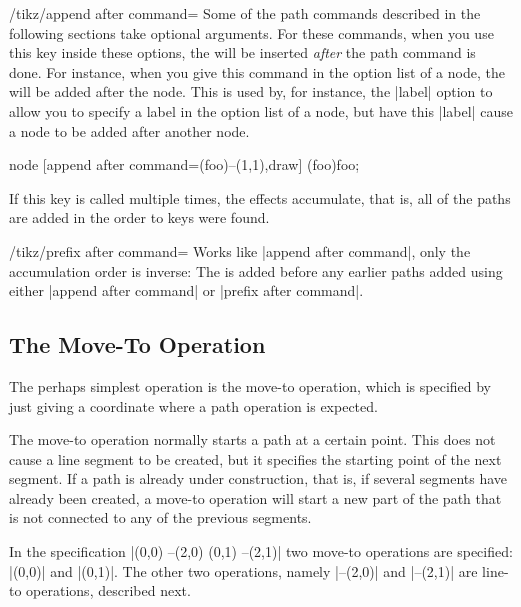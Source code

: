 \begin{key}{/tikz/append after command=}
  Some of the path commands described in the following sections take
  optional arguments. For these commands, when you use this key inside
  these options, the  will be inserted \emph{after} the
  path command is done. For instance, when you give this command in
  the option list of a node, the  will be added after the
  node. This is used by, for instance, the |label| option to allow you
  to specify a label in the option list of a node, but have this
  |label| cause a node to be added after another node.
\begin{codeexample}[]
\tikz \draw node [append after command={(foo)--(1,1)},draw] (foo){foo};
\end{codeexample}
  If this key is called multiple times, the effects accumulate, that
  is, all of the paths are added in the order to keys were found.
\end{key}

\begin{key}{/tikz/prefix after command=}
  Works like |append after command|, only the accumulation order is
  inverse: The  is added before any earlier paths added
  using either |append after command| or |prefix after command|.
\end{key}



\subsection{The Move-To Operation}

The perhaps simplest operation is the move-to operation, which is
specified by just giving a coordinate where a path operation is
expected.

\begin{pathoperation}[noindex]{}{}
  The move-to operation normally starts a path at a certain
  point. This does not cause a line segment to be created, but it
  specifies the starting point of the next segment. If a path is
  already under construction, that is, if several segments have
  already been created, a move-to operation will start a new part of the
  path that is not connected to any of the previous segments.

\begin{codeexample}[]
\end{codeexample}

  In the specification |(0,0) --(2,0) (0,1) --(2,1)| two move-to
  operations are specified: |(0,0)| and |(0,1)|. The other two
  operations, namely |--(2,0)| and |--(2,1)| are line-to operations,
  described next.
\end{pathoperation}

